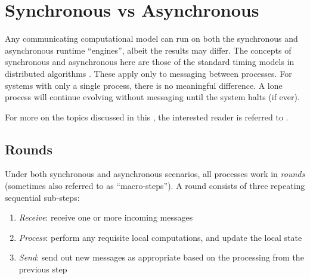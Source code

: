 \section{\label{sec:back:syncasync}Synchronous vs Asynchronous}


Any communicating computational model can run on both the synchronous and asynchronous runtime ``engines'', albeit the results may differ.
The concepts of synchronous and asynchronous here are those of the standard timing models in distributed algorithms \cite{Lynch1996}.
These apply only to messaging between processes.  For systems with only a single process, there is no meaningful difference.  A lone process will continue evolving without messaging until the system halts (if ever).

For more on the topics discussed in this , the interested reader is referred to \cite{Fokkink2013,Lynch1996,Tel2000}.

\subsection{Rounds}
Under both synchronous and asynchronous scenarios, all processes work in \emph{rounds} (sometimes also referred to as ``macro-steps'').  A round consists of three repeating sequential sub-steps:
\begin{enumerate}
    \item \emph{Receive}:  receive one or more incoming messages
    \item \emph{Process}:  perform any requisite local computations, and update the local state
    \item \emph{Send}:  send out new messages as appropriate based on the processing from the previous step
\end{enumerate}

